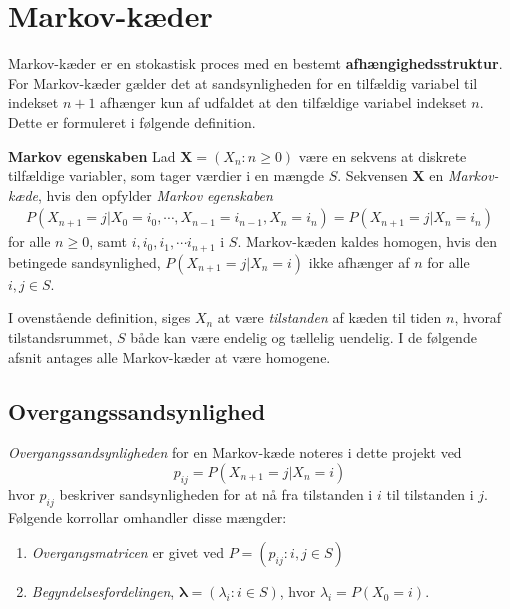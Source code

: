 \section{Markov-kæder}
Markov-kæder er en stokastisk proces med en bestemt \textbf{afhængighedsstruktur}. For Markov-kæder gælder det at sandsynligheden for en tilfældig variabel til indekset $n+1$ afhænger kun af udfaldet at den tilfældige variabel indekset $n$. Dette er formuleret i følgende definition.

\begin{minipage}\textwidth
\begin{defn}\textbf{Markov egenskaben} %
\newline
Lad $\mathbf{X}=(X_n:n\geq 0)$ være en sekvens at diskrete tilfældige variabler, som tager værdier i en mængde $S$.
Sekvensen $\mathbf{X}$ en \textit{Markov-kæde}, hvis den opfylder \textit{Markov egenskaben}
\begin{align*}
    P(X_{n+1} = j | X_0 = i_0, \cdots, X_{n-1} = i_{n-1}, X_n = i_n) =  P(X_{n+1} = j | X_n = i_n)
\end{align*}
for alle $n\geq 0$, samt $i, i_0, i_1, \cdots i_{n+1}$ i $S$.
Markov-kæden kaldes homogen, hvis den betingede sandsynlighed, $P(X_{n+1}=j|X_n=i)$ ikke afhænger af $n$ for alle $i,j\in S$.
\end{defn}
\end{minipage}

I ovenstående definition, siges $X_n$ at være \textit{tilstanden} af kæden til tiden $n$, hvoraf tilstandsrummet, $S$ både kan være endelig og tællelig uendelig. 
I de følgende afsnit antages alle Markov-kæder at være homogene.




\subsection{Overgangssandsynlighed}
\textit{Overgangssandsynligheden} for en Markov-kæde noteres i dette projekt ved $$p_{ij}=P(X_{n+1}=j|X_n=i)$$
hvor $p_{ij}$ beskriver sandsynligheden for at nå fra tilstanden i $i$ til tilstanden i $j$.\\
Følgende korrollar omhandler disse mængder:
\begin{enumerate}[label=(\alph*)]
    \item \textit{Overgangsmatricen} er givet ved $P=(p_{ij}:i,j\in S)$
    \item \textit{Begyndelsesfordelingen}, $\bm{\lambda}=(\lambda_i:i\in S)$, hvor $\lambda_i=P(X_0=i)$.
\end{enumerate}

